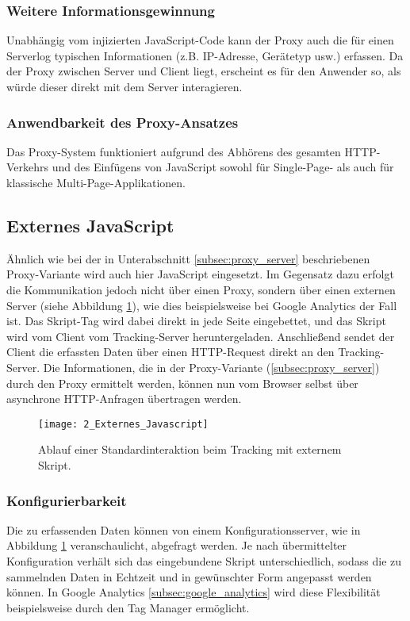 \subsubsection{Weitere Informationsgewinnung}
Unabhängig vom injizierten JavaScript-Code kann der Proxy auch die für einen Serverlog typischen Informationen (z.B. IP-Adresse, Gerätetyp usw.) erfassen. Da der Proxy zwischen Server und Client liegt, erscheint es für den Anwender so, als würde dieser direkt mit dem Server interagieren.

\subsubsection{Anwendbarkeit des Proxy-Ansatzes}
Das Proxy-System funktioniert aufgrund des Abhörens des gesamten HTTP-Verkehrs und des Einfügens von JavaScript sowohl für Single-Page- als auch für klassische Multi-Page-Applikationen.

\subsection{Externes JavaScript}
\label{subsec:external_js}
Ähnlich wie bei der in Unterabschnitt \ref{subsec:proxy_server} beschriebenen Proxy-Variante wird auch hier JavaScript eingesetzt. Im Gegensatz dazu erfolgt die Kommunikation jedoch nicht über einen Proxy, sondern über einen externen Server (siehe Abbildung \ref{fig:external_javascript}), wie dies beispielsweise bei Google Analytics \cite{weber2015practical} der Fall ist. Das Skript-Tag wird dabei direkt in jede Seite eingebettet, und das Skript wird vom Client vom Tracking-Server heruntergeladen. Anschließend sendet der Client die erfassten Daten über einen HTTP-Request direkt an den Tracking-Server.  
Die Informationen, die in der Proxy-Variante (\ref{subsec:proxy_server}) durch den Proxy ermittelt werden, können nun vom Browser selbst über asynchrone HTTP-Anfragen übertragen werden.

\begin{figure}[H]
\centering
\texttt{[image: 2\_Externes\_Javascript]}
\caption{Ablauf einer Standardinteraktion beim Tracking mit externem Skript.}
\label{fig:external_javascript}
\end{figure}

\subsubsection{Konfigurierbarkeit}
Die zu erfassenden Daten können von einem Konfigurationsserver, wie in Abbildung \ref{fig:external_javascript} veranschaulicht, abgefragt werden. Je nach übermittelter Konfiguration verhält sich das eingebundene Skript unterschiedlich, sodass die zu sammelnden Daten in Echtzeit und in gewünschter Form angepasst werden können. In Google Analytics \ref{subsec:google_analytics} wird diese Flexibilität beispielsweise durch den Tag Manager ermöglicht.

